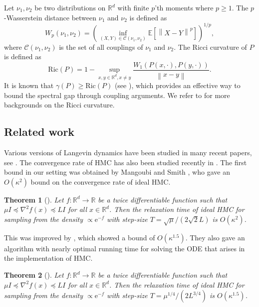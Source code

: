 \documentclass[11pt]{article}
\numberwithin{equation}{section}
\newtheorem{theorem}{Theorem}[section]
\theoremstyle{definition}
\theoremstyle{plain}
\newcommand{\R}{\mathbb R}
\newcommand{\eee}{\mathrm e}
\newcommand{\Exp}{\mathbb{E}}
\newcommand{\norm}[1]{\left\lVert #1 \right\rVert}
\newcommand{\grad}{\nabla}
\begin{document}
Let $\nu_1,\nu_2$ be two distributions on $\R^d$ with finite $p$'th moments where $p \ge 1$. 
The $p$-Wasserstein distance between $\nu_1$ and $\nu_2$ is defined as
\[
W_p(\nu_1,\nu_2) = \left( \inf_{(X,Y) \in \mathcal{C}(\nu_1,\nu_2)} \Exp\left[ \norm{X-Y}^p \right] \right)^{1/p},
\]
where $\mathcal{C}(\nu_1,\nu_2)$ is the set of all couplings of $\nu_1$ and $\nu_2$. 
The Ricci curvature of $P$ is defined as
\[
\mathrm{Ric}(P) = 1 - \sup_{x,y \in \R^d, x \neq y} \frac{W_1(P(x, \cdot), P(y, \cdot))}{\norm{x-y}}. 
\]
It is known that $\gamma(P) \ge \mathrm{Ric}(P)$ (see \cite[Proposition 29]{O09}), which provides an effective way to bound the spectral gap through coupling arguments. 
We refer to \cite{O09} for more backgrounds on the Ricci curvature. 
	
	

\subsection{Related work}
Various versions of Langevin dynamics have been studied in many recent papers, see \cite{D17,DK19, ZLC17,RRT17, DRD18,CCBJ, CCABJ18,CFMBJ18, DCWY18,W18, VW19,MCCFBJ19}. 
The convergence rate of HMC %
has also been   %
studied recently in \cite{LSV18,LV18,MS17, MS19,MV18,SRH14}. 
%
The first bound %
in  %
our setting was obtained by Mangoubi and Smith \cite{MS17}, who gave an $O(\kappa^2)$ bound on the convergence rate of ideal HMC. 

\begin{theorem}[{\cite[Theorem 1]{MS17}}]
	Let $f:\R^d \to\R$ be a twice differentiable function such that $\mu I \preceq \grad^2 f(x) \preceq L I$ for all $x\in\R^d$. 
	Then the relaxation time of ideal HMC for sampling from the density $\propto \eee^{-f}$ with step-size $T = \sqrt{\mu}/(2\sqrt{2} L)$ is $O(\kappa^{2})$.  
\end{theorem}


This was improved by \cite{LSV18}, which showed a bound of $O(\kappa^{1.5})$. 
They also gave an algorithm with nearly optimal running time for solving the ODE that arises in the implementation of HMC.  

\begin{theorem}[{\cite[Lemma 1.8]{LSV18}}]
	Let $f:\R^d \to\R$ be a twice differentiable function such that $\mu I \preceq \grad^2 f(x) \preceq L I$ for all $x\in\R^d$. 
	Then the relaxation time of ideal HMC for sampling from the density $\propto \eee^{-f}$ with step-size $T = \mu^{1/4}/(2L^{3/4})$ is $O(\kappa^{1.5})$.  
\end{theorem}
\end{document}
